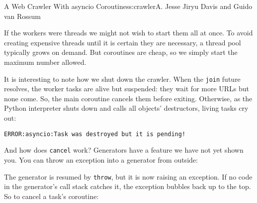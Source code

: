 \begin{aosachapter}{A Web Crawler With asyncio Coroutines}{s:crawler}{A. Jesse Jiryu Davis and Guido van Rossum}
\begin{Shaded}
\begin{Highlighting}[]
          
         
\end{Highlighting}
\end{Shaded}

If the workers were threads we might not wish to start them all at once.
To avoid creating expensive threads until it is certain they are
necessary, a thread pool typically grows on demand. But coroutines are
cheap, so we simply start the maximum number allowed.

It is interesting to note how we shut down the crawler. When the
\texttt{join} future resolves, the worker tasks are alive but suspended:
they wait for more URLs but none come. So, the main coroutine cancels
them before exiting. Otherwise, as the Python interpreter shuts down and
calls all objects' destructors, living tasks cry out:

\begin{verbatim}
ERROR:asyncio:Task was destroyed but it is pending!
\end{verbatim}

And how does \texttt{cancel} work? Generators have a feature we have not
yet shown you. You can throw an exception into a generator from outside:

\begin{Shaded}
\begin{Highlighting}[]
\NormalTok{)  }
\NormalTok{(}\NormalTok{))}
\end{Highlighting}
\end{Shaded}

The generator is resumed by \texttt{throw}, but it is now raising an
exception. If no code in the generator's call stack catches it, the
exception bubbles back up to the top. So to cancel a task's coroutine:

\begin{Shaded}
\begin{Highlighting}[]
     \NormalTok{):}
\end{Highlighting}
\end{Shaded}


\end{aosachapter}
